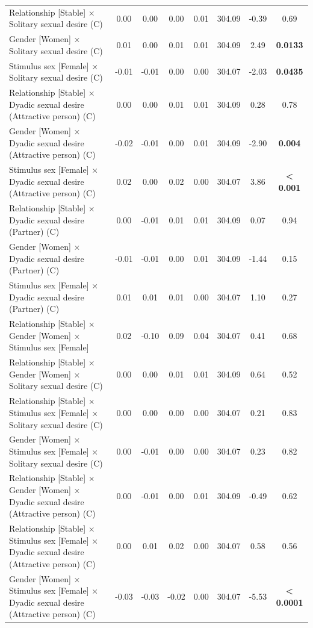 \documentclass[
  bookmarksnumbered]{article}
\begin{document}
\begin{table}[H]
{\begin{threeparttable}
\begin{tabular}[t]{lccccccc}
Relationship [Stable] × Solitary sexual desire (C) & 0.00 & 0.00 & 0.00 & 0.01 & 304.09 & -0.39 & 0.69\\
Gender [Women] × Solitary sexual desire (C) & 0.01 & 0.00 & 0.01 & 0.01 & 304.09 & 2.49 & \textbf{0.0133}\\
Stimulus sex [Female] × Solitary sexual desire (C) & -0.01 & -0.01 & 0.00 & 0.00 & 304.07 & -2.03 & \textbf{0.0435}\\
Relationship [Stable] × Dyadic sexual desire (Attractive person) (C) & 0.00 & 0.00 & 0.01 & 0.01 & 304.09 & 0.28 & 0.78\\
Gender [Women] × Dyadic sexual desire (Attractive person) (C) & -0.02 & -0.01 & 0.00 & 0.01 & 304.09 & -2.90 & \textbf{0.004}\\
Stimulus sex [Female] × Dyadic sexual desire (Attractive person) (C) & 0.02 & 0.00 & 0.02 & 0.00 & 304.07 & 3.86 & \textbf{< 0.001}\\
Relationship [Stable] × Dyadic sexual desire (Partner) (C) & 0.00 & -0.01 & 0.01 & 0.01 & 304.09 & 0.07 & 0.94\\
Gender [Women] × Dyadic sexual desire (Partner) (C) & -0.01 & -0.01 & 0.00 & 0.01 & 304.09 & -1.44 & 0.15\\
Stimulus sex [Female] × Dyadic sexual desire (Partner) (C) & 0.01 & 0.01 & 0.01 & 0.00 & 304.07 & 1.10 & 0.27\\
Relationship [Stable] × Gender [Women] × Stimulus sex [Female] & 0.02 & -0.10 & 0.09 & 0.04 & 304.07 & 0.41 & 0.68\\
Relationship [Stable] × Gender [Women] × Solitary sexual desire (C) & 0.00 & 0.00 & 0.01 & 0.01 & 304.09 & 0.64 & 0.52\\
Relationship [Stable] × Stimulus sex [Female] × Solitary sexual desire (C) & 0.00 & 0.00 & 0.00 & 0.00 & 304.07 & 0.21 & 0.83\\
Gender [Women] × Stimulus sex [Female] × Solitary sexual desire (C) & 0.00 & -0.01 & 0.00 & 0.00 & 304.07 & 0.23 & 0.82\\
Relationship [Stable] × Gender [Women] × Dyadic sexual desire (Attractive person) (C) & 0.00 & -0.01 & 0.00 & 0.01 & 304.09 & -0.49 & 0.62\\
Relationship [Stable] × Stimulus sex [Female] × Dyadic sexual desire (Attractive person) (C) & 0.00 & 0.01 & 0.02 & 0.00 & 304.07 & 0.58 & 0.56\\
Gender [Women] × Stimulus sex [Female] × Dyadic sexual desire (Attractive person) (C) & -0.03 & -0.03 & -0.02 & 0.00 & 304.07 & -5.53 & \textbf{< 0.0001}\\

\end{tabular}
\end{threeparttable}}
\end{table}
\end{document}
